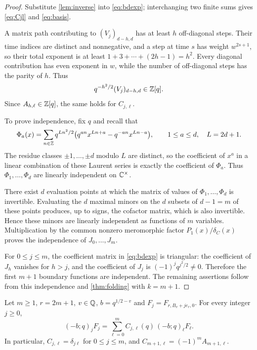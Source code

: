 \begin{proof}
Substitute \cref{lem:inverse} into \eqref{eq:bdexp}; interchanging two finite sums gives \eqref{eq:Cjl} and \eqref{eq:basis}.

A matrix path contributing to $(V_j)_{d-h,d}$ has at least $h$ off-diagonal steps. Their time indices are distinct and nonnegative, and a step at time $s$ has weight $w^{2s+1}$, so their total exponent is at least $1+3+\cdots+(2h-1)=h^2$. Every diagonal contribution has even exponent in $w$, while the number of off-diagonal steps has the parity of $h$. Thus
\[
q^{-h^2/2}(V_j)_{d-h,d}\in\mathbb{Z}[q].
\]
Since $A_{h,\ell}\in\mathbb{Z}[q]$, the same holds for $C_{j,\ell}$.

To prove independence, fix $q$ and recall that
\[
\Phi_a(x)=\sum_{n\in\mathbb{Z}}q^{Ln^2/2}\bigl(q^{an}x^{Ln+a}-q^{-an}x^{Ln-a}\bigr),\qquad 1\le a\le d,\quad L=2d+1.
\]
The residue classes $\pm1,\dots,\pm d$ modulo $L$ are distinct, so the coefficient of $x^a$ in a linear combination of these Laurent series is exactly the coefficient of $\Phi_a$. Thus $\Phi_1,\dots,\Phi_d$ are linearly independent on $\mathbb{C}^\times$.

There exist $d$ evaluation points at which the matrix of values of $\Phi_1,\dots,\Phi_d$ is invertible. Evaluating the $d$ maximal minors on the $d$ subsets of $d-1=m$ of these points produces, up to signs, the cofactor matrix, which is also invertible. Hence these minors are linearly independent as functions of $m$ variables. Multiplication by the common nonzero meromorphic factor $P_1(x)/\delta_C(x)$ proves the independence of $J_0,\dots,J_m$.

For $0\le j\le m$, the coefficient matrix in \eqref{eq:bdexp} is triangular: the coefficient of $J_h$ vanishes for $h>j$, and the coefficient of $J_j$ is $(-1)^jq^{j^2/2}\ne0$. Therefore the first $m+1$ boundary functions are independent. The remaining assertions follow from this independence and \cref{thm:folding} with $k=m+1$.
\end{proof}

\begin{corollary}\label{cor:reduction}
Let $m\ge1$, $r=2m+1$, $v\in\mathbb{Q}$, $b=q^{1/2-v}$ and $F_j=F_{r,B_v+je_r,0}$. For every integer $j\ge0$,
\begin{equation}\label{eq:reduction}
(-b;q)_jF_j=\sum_{\ell=0}^mC_{j,\ell}(q)\,(-b;q)_\ell F_\ell.
\end{equation}
In particular, $C_{j,\ell}=\delta_{j\ell}$ for $0\le j\le m$, and $C_{m+1,\ell}=(-1)^mA_{m+1,\ell}$.
\end{corollary}

